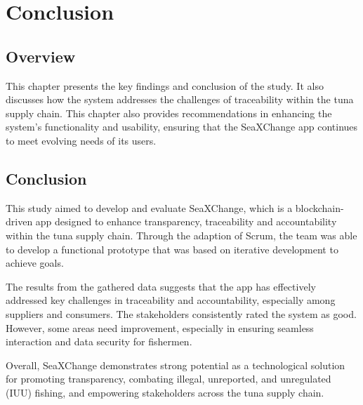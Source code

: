 \chapter{Conclusion}
\section{Overview}
This chapter  presents the key findings and conclusion of the study. It also discusses how the system addresses the challenges of traceability within the tuna supply chain. This chapter also provides recommendations in enhancing the system's functionality and usability, ensuring that the SeaXChange app continues to meet evolving needs of its users. 


\section{Conclusion}
This study aimed to develop and evaluate SeaXChange, which is a blockchain-driven app designed to enhance transparency, traceability and accountability within the tuna supply chain. Through the adaption of Scrum, the team was able to develop a functional prototype that was based on iterative development to achieve goals. 

\noindent The results from the gathered data suggests that the app has effectively addressed key challenges in traceability and accountability, especially among suppliers and consumers. The stakeholders consistently rated the system as good. However, some areas need improvement, especially in ensuring seamless interaction and data security for fishermen.

\noindent Overall, SeaXChange demonstrates strong potential as a technological solution for promoting transparency, combating illegal, unreported, and unregulated (IUU) fishing, and empowering stakeholders across the tuna supply chain.

